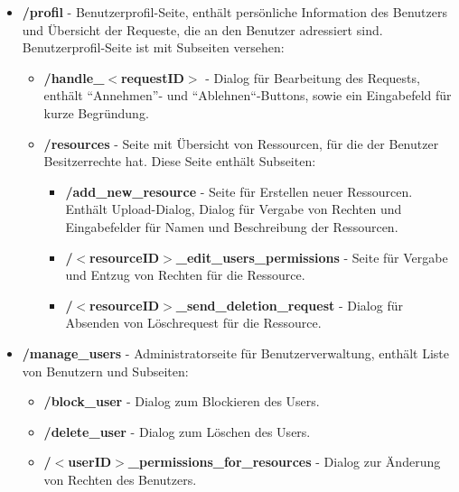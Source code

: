 \documentclass[parskip=full,11pt]{scrartcl}
\renewcommand{\labelitemii}{$\circ$}
\begin{document}
\renewcommand{\labelitemi}{$\bullet$}
\renewcommand{\labelitemii}{$\bullet$}
\renewcommand{\labelitemiii}{$\bullet$}
\begin{itemize}[itemsep=0pt]
\item \textbf{/profil} - Benutzerprofil-Seite, enthält persönliche Information des Benutzers und Übersicht der Requeste, die an den Benutzer adressiert sind.\\

Benutzerprofil-Seite ist mit Subseiten versehen:
\begin{itemize}[itemsep=0pt]
\item \textbf{/handle{\_}$<$requestID$>$} - Dialog für Bearbeitung des Requests, enthält ``Annehmen''- und ``Ablehnen``-Buttons, sowie ein Eingabefeld für kurze Begründung.
\item \textbf{/resources} - Seite mit Übersicht von Ressourcen, für die der Benutzer Besitzerrechte hat. Diese Seite enthält Subseiten:
\begin{itemize}[itemsep=0pt]
\item \textbf{/add{\_}new{\_}resource} - Seite für Erstellen neuer Ressourcen. Enthält Upload-Dialog, Dialog für Vergabe von Rechten und Eingabefelder für Namen und Beschreibung der Ressourcen.
\item \textbf{/$<$resourceID$>${\_}edit{\_}users{\_}permissions} - Seite für Vergabe und Entzug von Rechten für die Ressource.
\item \textbf{/$<$resourceID$>${\_}send{\_}deletion{\_}request} - Dialog für Absenden von Löschrequest für die Ressource.
\end{itemize}
\end{itemize}


\item \textbf{/manage{\_}users} - Administratorseite für Benutzerverwaltung, enthält Liste von Benutzern und Subseiten:
\begin{itemize}[itemsep=0pt]
\item \textbf{/block{\_}user} - Dialog zum Blockieren des Users.
\item \textbf{/delete{\_}user} - Dialog zum Löschen des Users.
\item \textbf{/$<$userID$>${\_}permissions{\_}for{\_}resources} - Dialog zur Änderung von Rechten des Benutzers.
\end{itemize}


\end{itemize}
\end{document}
